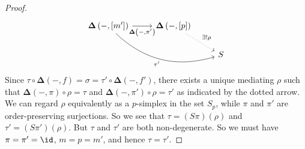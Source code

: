 \begin{proof}
\[\begin{tikzcd}
\mathbf{\Delta}\left(-,\left[m'\right]\right) \arrow[swap]{r}{\mathbf{\Delta}\left(-,\pi'\right)} \arrow[swap, bend right]{rrd}{\tau'} & \mathbf{\Delta}\left(-,\left[p\right]\right) \arrow[dotted]{dr}{\exists ! \rho} \\
\; & \; & S
\end{tikzcd} \]
Since $\tau \circ \mathbf{\Delta}(-,f) = \sigma = \tau' \circ\mathbf{\Delta}(-,f')$, there exists a unique mediating $\rho$ such that $\mathbf{\Delta}(-,\pi) \circ \rho = \tau$ and $\mathbf{\Delta}(-,\pi') \circ \rho = \tau'$ as indicated by the dotted arrow. We can regard $\rho$ equivalently as a $p$-simplex in the set $S_p$, while $\pi$ and $\pi'$ are order-preserving surjections. So we see that $\tau = (S \pi)(\rho)$ and $\tau' = (S \pi')(\rho)$. But $\tau$ and $\tau'$ are both non-degenerate. So we must have $\pi = \pi' = \id$, $m=p=m'$, and hence $\tau = \tau'$.
\end{proof}


